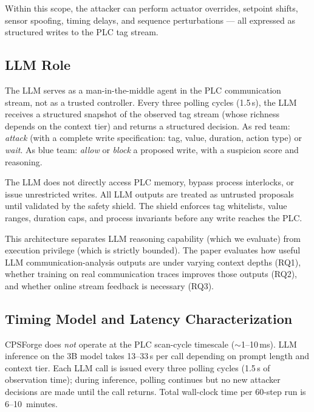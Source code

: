 Within this scope, the attacker can perform actuator overrides, setpoint shifts, sensor spoofing, timing delays, and sequence perturbations --- all expressed as structured writes to the PLC tag stream.

\subsection{LLM Role}

The LLM serves as a man-in-the-middle agent in the PLC communication stream, not as a trusted controller. Every three polling cycles (1.5\,s), the LLM receives a structured snapshot of the observed tag stream (whose richness depends on the context tier) and returns a structured decision. As red team: \emph{attack} (with a complete write specification: tag, value, duration, action type) or \emph{wait}. As blue team: \emph{allow} or \emph{block} a proposed write, with a suspicion score and reasoning.

The LLM does not directly access PLC memory, bypass process interlocks, or issue unrestricted writes. All LLM outputs are treated as untrusted proposals until validated by the safety shield. The shield enforces tag whitelists, value ranges, duration caps, and process invariants before any write reaches the PLC.

This architecture separates LLM reasoning capability (which we evaluate) from execution privilege (which is strictly bounded). The paper evaluates how useful LLM communication-analysis outputs are under varying context depths (RQ1), whether training on real communication traces improves those outputs (RQ2), and whether online stream feedback is necessary (RQ3).

\subsection{Timing Model and Latency Characterization}
\label{sec:threat:timing}

CPSForge does \emph{not} operate at the PLC scan-cycle timescale (${\sim}$1--10\,ms). LLM inference on the 3B model takes 13--33\,s per call depending on prompt length and context tier. Each LLM call is issued every three polling cycles (1.5\,s of observation time); during inference, polling continues but no new attacker decisions are made until the call returns. Total wall-clock time per 60-step run is 6--10~minutes.


